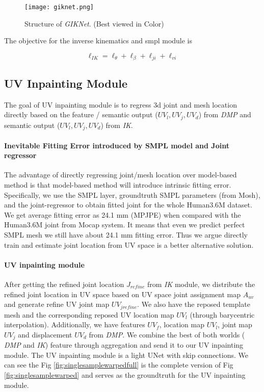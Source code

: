 \documentclass[10pt,twocolumn,letterpaper]{article}
\begin{document}
\begin{figure}
\centering
\texttt{[image: giknet.png]}
\caption{{Structure of \textit{GIKNet}. (Best viewed in Color) }}
\label{fig:giknet}
\end{figure}

The objective for the inverse kinematics and smpl module is 

\begin{equation}
{\ell_{IK}} = {\ell_{\theta}} + {\ell_{\beta}} + {\ell_{ji}} + {\ell_{vi}} 
  \label{eqn:IK}
\end{equation}

\subsection{UV Inpainting Module}

The goal of UV inpainting module is to regress 3d joint and mesh location directly based on the feature / semantic output ($UV_l,UV_j,UV_d$) from \textit{DMP} and semantic output ($UV_l,UV_j,UV_d$) from \textit{IK}.

\paragraph{Inevitable Fitting Error introduced by SMPL model and Joint regressor} The advantage of directly regressing joint/mesh location over model-based method is that model-based method will introduce intrinsic fitting error. Specifically, we use the SMPL layer, groundtruth SMPL parameters (from Mosh),  and the joint-regressor \cite{spin} to obtain  fitted joint for the whole Human3.6M dataset. We get average fitting error as 24.1 mm (MPJPE) when compared with the Human3.6M joint from Mocap system. It means that even we predict perfect SMPL mesh we still have about 24.1 mm fitting error. Thus we argue directly train and estimate joint location from UV space is a better alternative solution. 

\paragraph{UV inpainting module} After getting the refined joint location $J_{refine}$ from \textit{IK} module, we   distribute the refined joint location in UV space based on UV space joint assignment map $A_{uv}$ and generate refine UV joint map $UV_{jrefine}$. We also have the reposed template mesh and the corresponding reposed UV location map $UV_{l}$ (through barycentric interpolation). 
Additionally, we have features $UV_f$, location map $UV_l$, joint map $UV_j$ and displacement $UV_d$ from \textit{DMP}. We combine the best of both worlds ( \textit{DMP} and  \textit{IK}) feature through aggregation and send it to our UV inpainting module. The UV inpainting module is a light UNet with skip connections. We can see the Fig \ref{fig:singlesamplewarpedfull} is the complete version of Fig \ref{fig:singlesamplewarped} and  serves as the groundtruth for the UV inpainting module.
\end{document}
